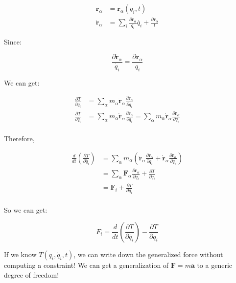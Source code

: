 \documentclass{article}
\theoremstyle{definition}
\theoremstyle{plain}
\theoremstyle{remark}
\begin{document}
\begin{align*}
    \mathbf{r}_\alpha &= \mathbf{r}_\alpha(q_i, t) \\
    \dot{\mathbf{r}}_\alpha &= \sum_i \frac{\partial \mathbf{r}_\alpha}{q_i} \dot{q_i} + \frac{\partial \mathbf{r}_\alpha}{t}
\end{align*}

Since:

\[
    \frac{\partial \dot{\mathbf{r}}_\alpha}{\dot{q_i}} = \frac{\partial \mathbf{r}_\alpha}{q_i}
\]

We can get:

\begin{align*}
    \frac {\partial T}{\partial q_i} &= \sum_\alpha m_\alpha \dot{\mathbf{r}}_\alpha \frac{\partial \dot{\mathbf{r}}_\alpha}{\partial q_i} \\
    \frac {\partial T}{\partial \dot{q_i}} &= \sum_\alpha m_\alpha \dot{\mathbf{r}}_\alpha \frac{\partial \dot{\mathbf{r}}_\alpha}{\partial \dot{q_i}} = \sum_\alpha m_\alpha \dot{\mathbf{r}}_\alpha \frac{\partial \mathbf{r}_\alpha}{\partial q_i}\\
\end{align*}

Therefore, 

\begin{align*}
    \frac{d}{dt} (\frac {\partial T}{\partial \dot{q_i}}) &= \sum_\alpha m_\alpha \left(\ddot{\mathbf{r}}_\alpha \frac{\partial \mathbf{r}_\alpha}{\partial q_i} + \dot{\mathbf{r}}_\alpha \frac{\partial \dot{\mathbf{r}}_\alpha}{\partial q_i}\right) \\
    &= \sum_\alpha \mathbf{F}_\alpha \frac{\partial \mathbf{r}_\alpha}{\partial q_i} + \frac{\partial T}{\partial q_i} \\
    &= \mathbf{F}_i + \frac{\partial T}{\partial q_i} \\
\end{align*}

So we can get:

\[
    F_i = \frac{d}{dt} (\frac {\partial T}{\partial \dot{q_i}}) - \frac{\partial T}{\partial q_i}
\]

If we know $T(q_i, \dot{q}_i, t)$, we can write down the generalized force without computing a constraint! We can get a generalization of $\mathbf{F}=m\mathbf{a}$ to a generic degree of freedom!
\end{document}
